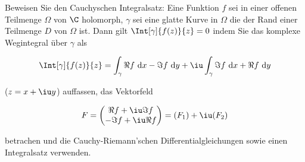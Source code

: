 
\begin{exercise}

Beweisen Sie den Cauchyschen Integralsatz:
Eine Funktion $f$ sei in einer offenen Teilmenge $\Omega$ von $\C$ holomorph, $\gamma$ sei eine glatte Kurve in $\Omega$ die der Rand einer Teilmenge $D$ von $\Omega$ ist.
Dann gilt $\Int[\gamma]{f(z)}{z} = 0$ indem Sie das komplexe Wegintegral über $\gamma$ als

\begin{align*}
    \Int[\gamma]
    {
        f(z)
    }{z}
    =
    \int_\gamma
            \Re f
            ~\mathrm d x
            -
        \Im f
        ~\mathrm d y
    +
    \iu
    \int_\gamma
            \Im f
            ~\mathrm d x
            +
        \Re f
        ~\mathrm d y
\end{align*}

($z = x + \iu y$) auffassen, das Vektorfeld

\begin{align*}
    F
    =
    \begin{pmatrix}
         \Re f + \iu \Im f \\
        -\Im f + \iu \Re f
    \end{pmatrix}
    =
    (F_1) + \iu (F_2)
\end{align*}

betrachen und die Cauchy-Riemann'schen Differentialgleichungen sowie einen Integralsatz verwenden.

\end{exercise}


